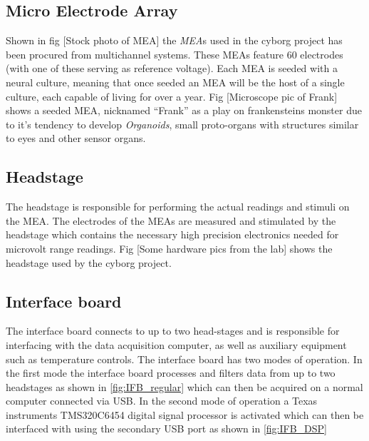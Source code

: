 \subsection{Micro Electrode Array}
Shown in fig [Stock photo of MEA] the \textit{MEA}s used in the cyborg project has been procured
from multichannel systems.
These MEAs feature 60 electrodes (with one of these serving as reference
voltage).
Each MEA is seeded with a neural culture, meaning that once seeded an MEA will
be the host of a single culture, each capable of living for over a year.
Fig [Microscope pic of Frank] shows a seeded MEA, nicknamed ``Frank'' as a play on frankensteins
monster due to it's tendency to develop \emph{Organoids}, small proto-organs
with structures similar to eyes and other sensor organs.
\subsection{Headstage}
The headstage is responsible for performing the actual readings and stimuli on
the MEA.
The electrodes of the MEAs are measured and stimulated by
the headstage which contains the necessary high precision electronics needed for
microvolt range readings.
Fig [Some hardware pics from the lab] shows the headstage used by the cyborg project.
\subsection{Interface board}
The interface board connects to up to two head-stages
and is responsible for interfacing with the data acquisition computer, as well
as auxiliary equipment such as temperature controls. The interface board has two
modes of operation. In the first mode the interface board processes and filters
data from up to two headstages as shown in \ref{fig:IFB_regular} which can then
be acquired on a normal computer connected via USB. In the second mode of
operation a Texas instruments TMS320C6454 digital signal processor is activated
which can then be interfaced with using the secondary USB port as shown in
\ref{fig:IFB_DSP}
